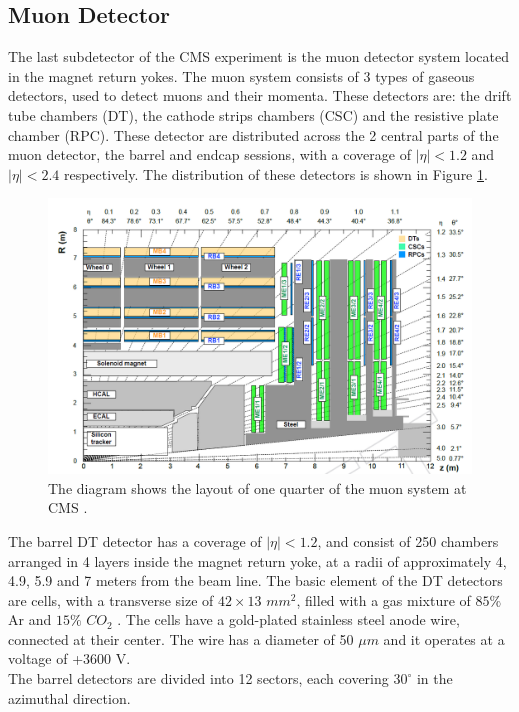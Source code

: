 \subsection{Muon Detector}
The last subdetector of the CMS experiment is the muon detector system located in the magnet return yokes. The muon system consists of 3 types of gaseous detectors, used to detect muons and their momenta. These detectors are:  the drift tube chambers (DT), the cathode strips chambers (CSC) and the resistive plate chamber (RPC). These detector are distributed across the 2 central parts of the muon detector, the barrel and endcap sessions, with a coverage of $|\eta|<1.2$ and $|\eta|<2.4$ respectively. The distribution of these detectors is shown in Figure \ref{Muons}.
\begin{figure}[H]
    \centering
    \includegraphics[scale=.45]{Chapter3/dt.png}
    \caption[One quarter of the CMS muon system. ]{The diagram shows the layout of one quarter of the muon system at CMS \cite{cms-manual}.}
    \label{Muons}
\end{figure}

The barrel DT detector  has a coverage of $|\eta|<1.2$, and consist of 250 chambers arranged in 4 layers inside the magnet return yoke, at a radii of approximately 4, 4.9, 5.9 and 7 meters from the beam line. The basic element of the DT detectors are cells, with a transverse size of $42\times 13$ $mm^2$, filled with a gas mixture of $85\%$ Ar and $15\%$ $CO_2$ \cite{cms7}. The cells have a gold-plated stainless steel anode wire, connected at their center. The wire has a diameter of 50 $\mu m$ and it operates at a voltage of +3600 V. \\
The barrel detectors are divided into 12 sectors, each covering $30^{\circ}$ in the azimuthal direction.

